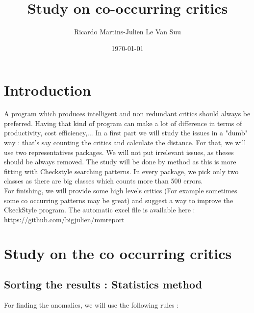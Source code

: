 \documentclass{article}
\begin{document}
\title{Study on co-occurring critics}
\author{Ricardo Martins-Julien Le Van Suu}
\date\today
\maketitle
\section{Introduction}
A program which produces intelligent and non redundant critics should always be preferred. Having that kind of program can make a lot of difference in terms of productivity, cost efficiency,... 
In a first part we will study the issues in a "dumb" way : that's say counting the critics and calculate the distance.
For that, we will use two representatives packages. We will not put irrelevant issues, as theses should be always removed. The study will be done by method as this is more fitting with Checkstyle searching patterns. In every package, we pick only two classes as there are big classes which counts more than 500 errors. \\
For finishing, we will provide some high levels critics (For example sometimes some co occurring patterns may be great) and suggest a way to improve the CkeckStyle program. The automatic excel file is available here : \url{https://github.com/bigjulien/mmreport}

\section{Study on the co occurring critics}

\subsection{Sorting the results : Statistics method} 
For finding the anomalies, we will use the following rules : 
\end{document}

